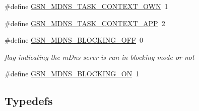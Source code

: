 \begin{DoxyCompactItemize}
\#define \hyperlink{a00526_a0d906077cc369b9de285db34d0e6b822}{GSN\_\-MDNS\_\-TASK\_\-CONTEXT\_\-OWN}~1
\item 
\#define \hyperlink{a00526_a36f02ee21df2ca0a58dc3f807838f51c}{GSN\_\-MDNS\_\-TASK\_\-CONTEXT\_\-APP}~2
\item 
\#define \hyperlink{a00668_ga67c2a611f981a7e2e787c479819f28cd}{GSN\_\-MDNS\_\-BLOCKING\_\-OFF}~0
\begin{DoxyCompactList}\small\item\em flag indicating the mDns servr is run in blocking mode or not \end{DoxyCompactList}\item 
\#define \hyperlink{a00526_a2415246cb4d8babf4d86c11437534374}{GSN\_\-MDNS\_\-BLOCKING\_\-ON}~1
\end{DoxyCompactItemize}
\subsection*{Typedefs}
